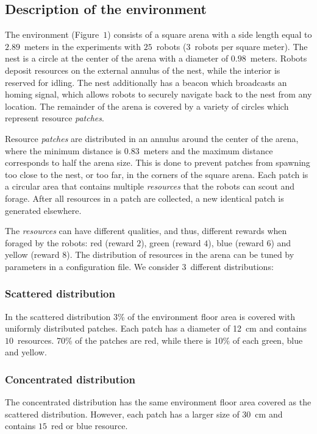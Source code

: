 \documentclass[runningheads]{llncs}
\begin{document}
\subsection{Description of the environment}
\label{ssec:env}

The environment (Figure~$1$) consists of a square arena with a side length equal to $2.89$~meters in the experiments with $25$~robots ($3$~robots per square meter). The nest is a circle at the center of the arena with a diameter of $0.98$~meters. Robots deposit resources on the external annulus of the nest, while the interior is reserved for idling. The nest additionally has a beacon which broadcasts an homing signal, which allows robots to securely navigate back to the nest from any location. The remainder of the arena is covered by a variety of circles which represent resource \emph{patches}.

Resource \emph{patches} are distributed in an annulus around the center of the arena, where the minimum distance is $0.83$~meters and the maximum distance corresponds to half the arena size. This is done to prevent patches from spawning too close to the nest, or too far, in the corners of the square arena. Each patch is a circular area that contains multiple \emph{resources} that the robots can scout and forage. After all resources in a patch are collected, a new identical patch is generated elsewhere.

The \emph{resources} can have different qualities, and thus, different rewards when foraged by the robots: red (reward $2$), green (reward $4$), blue (reward $6$) and yellow (reward $8$). 
The distribution of resources in the arena can be tuned by parameters in a configuration file. We consider $3$~different distributions:

\vspace{-5mm}
\subsubsection{Scattered distribution} 
In the scattered distribution $3$\% of the environment floor area is covered with uniformly distributed patches. Each patch has a diameter of 12~cm and contains $10$~resources. 70\% of the patches are red, while there is 10\% of each green, blue and yellow.

\vspace{-5mm}
\subsubsection{Concentrated distribution}
The concentrated distribution has the same environment floor area covered as the scattered distribution. However, each patch has a larger size of 30~cm and contains $15$~red or blue resource. 
\end{document}
